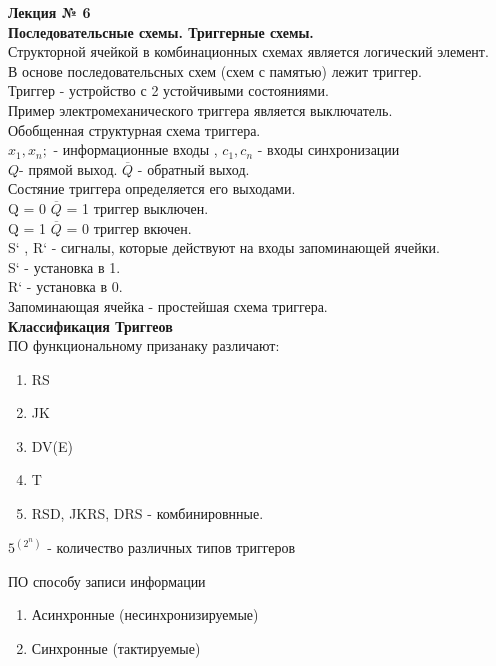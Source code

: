 

\LARGE{ \textbf {Лекция № 6}}\\
\Large{ \textbf { Последовательсные схемы.
Триггерные схемы.}} \\

Структорной ячейкой в комбинационных схемах является логический элемент.\\
В основе последовательсных схем (схем с памятью) лежит триггер.\\
Триггер - устройство с 2 устойчивыми состояниями.\\
Пример электромеханического триггера является выключатель.\\

Обобщенная структурная схема триггера.\\
$x_1, x_n ;$ - информационные входы , $c_1, c_n$ - входы синхронизации\\
$Q$- прямой выход. $\overline{Q}$ - обратный выход.\\
Состяние триггера определяется его выходами.\\
Q = 0  $\overline{Q}$ = 1 триггер выключен.\\
Q = 1  $\overline{Q}$ = 0 триггер вкючен.\\
S` , R`  - сигналы, которые действуют на входы запоминающей ячейки.\\
S` - установка в 1.\\
R` - установка в 0.\\
Запоминающая ячейка - простейшая схема триггера.\\


\Large{ \textbf { Классификация Триггеов }} \\
ПО функциональному призанаку различают:
\begin{enumerate}
  \item RS
  \item JK
  \item DV(E)
  \item T
  \item RSD, JKRS, DRS - комбинировнные.
\end{enumerate}
$5^(2^n)$ - количество различных типов триггеров

ПО способу записи информации\\
\begin{enumerate}
  \item Асинхронные (несинхронизируемые)
  \item Синхронные (тактируемые)
\end{enumerate}

